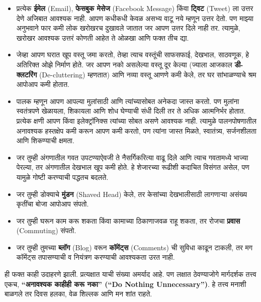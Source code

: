 \begin{itemize}
 \item प्रत्येक \textbf{ईमेल} (Email), \textbf{फेसबुक मेसेज} (Facebook Message) किंवा \textbf{ट्विट} (Tweet) ला उत्तर देणे अजिबात आवश्यक नाही. आपण कधीकधी केवळ असभ्य वाटू नये म्हणून उत्तर देतो. पण माझ्या अनुभवाने फार कमी लोक खरोखरच दुखावले जातात जर आपण उत्तर दिले नाही तर. त्यामुळे, खरोखर आवश्यक उत्तरं कोणती आहेत ते ओळखा आणि फक्त तीच द्या.
\item जेव्हा आपण घरात खूप वस्तू जमा करतो, तेव्हा त्याच वस्तूंची साफसफाई, देखभाल, साठवणूक,  हे अतिरिक्त ओझे निर्माण होते. जर आपण नको असलेल्या वस्तू दूर केल्या (ज्याला आजकाल \textbf{डी-क्लटरिंग} (De-cluttering) म्हणतात) आणि नव्या वस्तू आणणे कमी केले, तर घर सांभाळण्याचे श्रम आपोआप कमी होतात.
\item पालक म्हणून आपण आपल्या मुलांसाठी आणि त्यांच्यासोबत अनेकदा जास्त करतो. पण मुलांना स्वतंत्रपणे खेळायला, शिकायला आणि शोध घेण्याची संधी दिली तर ते अधिक आत्मनिर्भर होतात. प्रत्येक क्षणी आपण किंवा इलेक्ट्रॉनिक्स त्यांच्या सोबत असणे आवश्यक नाही. त्यामुळे पालनपोषणातील अनावश्यक हस्तक्षेप कमी करून आपण कमी करतो, पण त्यांना जास्त मिळते,  स्वातंत्र्य, सर्जनशीलता आणि शिकण्याची क्षमता.
\item जर तुम्ही अंगणातील गवत उपटण्याऐवजी ते नैसर्गिकरित्या वाढू दिले आणि त्याच गवतामध्ये भाज्या पेरल्या, तर अंगणातील देखभाल खूप कमी होते. हे शेजारच्या रूढीशी कदाचित विसंगत असेल, पण यामुळे गोष्टी करण्याची पद्धतच बदलते.
\item जर तुम्ही डोक्याचे \textbf{मुंडन} (Shaved Head) केले, तर केसांच्या देखभालीसाठी लागणाऱ्या असंख्य कृतींचा बोजा आपोआप संपतो.
\item जर तुम्ही घरून काम करू शकता किंवा कामाच्या ठिकाणाजवळ राहू शकता, तर रोजचा \textbf{प्रवास} (Commuting) संपतो.
\item जर तुम्ही तुमच्या \textbf{ब्लॉग} (Blog) वरून \textbf{कॉमेंट्स} (Comments) ची सुविधा काढून टाकली, तर मग कॉमेंट्स तपासण्याची व नियंत्रण करण्याची आवश्यकता उरत नाही.
 \end{itemize}
ही फक्त काही उदाहरणे झाली. प्रत्यक्षात याची संख्या अमर्याद आहे. पण लक्षात ठेवण्याजोगे मार्गदर्शक तत्त्व एकच,  \textbf{“अनावश्यक काहीही करू नका” (“Do Nothing Unnecessary”)}. हे तत्त्व मनाशी बाळगले तर दिवस हलका, वेळ शिल्लक आणि मन शांत राहते.


